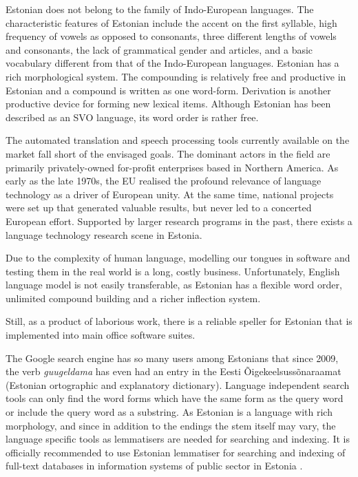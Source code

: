 \begin{multicols}{2}
Estonian does not belong to the family of Indo-European languages.  The characteristic features of Estonian include the accent on the ﬁrst syllable, high frequency of vowels as opposed to consonants, three different lengths of vowels and consonants, the lack of grammatical gender and articles, and a basic vocabulary different from that of the Indo-European languages.  Estonian has a rich morphological system.  The compounding is relatively free and productive in Estonian and a compound is written as one word-form.  Derivation is another productive device for forming new lexical items.  Although Estonian has been described as an SVO language, its word order is rather free.


The automated translation and speech processing tools currently available on the market fall short of the envisaged goals. The dominant actors in the field are primarily privately-owned for-profit enterprises based in Northern America. As early as the late 1970s, the EU realised the profound relevance of language technology as a driver of European unity.  At the same time, national projects were set up that generated valuable results, but never led to a concerted European effort.  Supported by larger research programs in the past, there exists a language technology research scene in Estonia.

Due to the complexity of human language, modelling our tongues in software and testing them in the real world is a long, costly business.  Unfortunately, English language model is not easily transferable, as Estonian has a flexible word order, unlimited compound building and a richer inflection system.

Still, as a product of laborious work, there is a reliable speller for Estonian that is implemented into main office software suites.

The Google search engine has so many users among Estonians that since 2009, the verb \textit{guugeldama} has even had an entry in the Eesti Õigekeelsussõnaraamat (Estonian ortographic and explanatory dictionary).  Language independent search tools can only find the word forms which have the same form as the query word or include the query word as a substring.  As Estonian is a language with rich morphology, and since in addition to the endings the stem itself may vary, the language specific tools as lemmatisers are needed for searching and indexing.  It is officially recommended to use Estonian lemmatiser for searching and indexing of full-text databases in information systems of public sector in Estonia \cite{RIA}.


\end{multicols}
